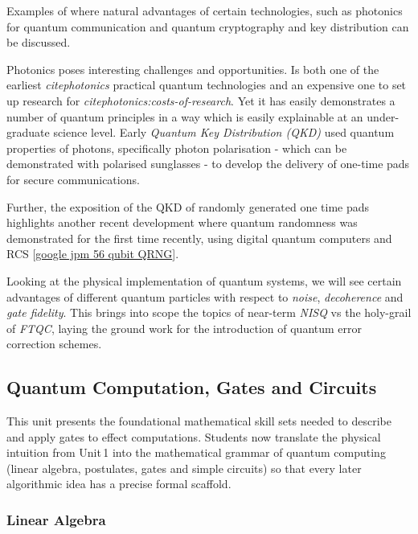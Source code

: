 Examples of where natural advantages of certain technologies, such as photonics for quantum communication 
and quantum cryptography and key distribution can be discussed.

Photonics poses interesting challenges and opportunities. 
Is both one of the earliest \emph{cite{photonics}} practical quantum technologies 
and an expensive one to set up research for \emph{cite{photonics:costs-of-research}}. 
Yet it has easily demonstrates a number of quantum principles in a way which is easily explainable at an under-graduate science level.
Early \emph{Quantum Key Distribution (QKD)}   used quantum properties of photons, 
specifically photon polarisation - which can be demonstrated with polarised sunglasses - to develop the delivery of one-time pads 
for secure communications.

Further, the exposition of the QKD of randomly generated one time pads highlights another recent development
where quantum randomness was demonstrated for the first time recently, using digital quantum computers and RCS
[\href{https://scitechdaily.com/a-56-qubit-quantum-computer-just-did-what-no-supercomputer-can/}{google jpm 56 qubit QRNG}].

Looking at the physical implementation of quantum systems, we will see certain advantages of different quantum particles
with respect to  \emph{noise}, \emph{decoherence} and \emph{gate fidelity}.
This brings into scope the topics of near-term \emph{NISQ} vs the holy-grail of \emph{FTQC}, 
laying the ground work for the introduction of quantum error correction schemes.

\subsection{Quantum Computation, Gates and Circuits}

This unit presents the foundational mathematical skill sets needed to describe and apply gates to effect computations. 
Students now translate the physical intuition from Unit 1 into the mathematical grammar of quantum computing
(linear algebra, postulates, gates and simple circuits) so that every later algorithmic idea has a precise formal scaffold.

\subsubsection*{Linear Algebra}

